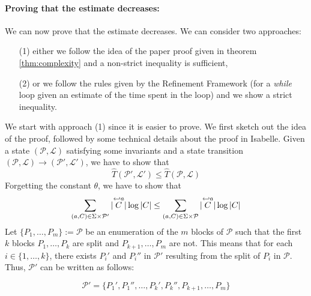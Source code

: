 \documentclass[12pt, a4 paper]{article}
\theoremstyle{definition}
\begin{document}
\paragraph{Proving that the estimate decreases:} We can now prove that the estimate decreases. We can consider two approaches:
\begin{itemize}
    \item[(1)] either we follow the idea of the paper proof given in theorem \ref{thm:complexity} and a non-strict inequality is sufficient,
    \item[(2)] or we follow the rules given by the Refinement Framework (for a \textit{while} loop given an estimate of the time spent in the loop) and we show a strict inequality.
\end{itemize}
We start with approach (1) since it is easier to prove. We first sketch out the idea of the proof, followed by some technical details about the proof in Isabelle. Given a state $(\mathcal{P}, \mathcal{L})$ satisfying some invariants and a state transition $(\mathcal{P}, \mathcal{L}) \rightarrow (\mathcal{P}', \mathcal{L}')$, we have to show that
\begin{equation*}
    \hat{T}(\mathcal{P}', \mathcal{L}') \leq \hat{T}(\mathcal{P}, \mathcal{L})
\end{equation*}
Forgetting the constant $\theta$, we have to show that
\begin{equation*}
    \sum_{(a, C) \in \Sigma\times \mathcal{P'}} | \overset{\hookleftarrow {a}}{C} | \log | C | \leq \sum_{(a, C) \in \Sigma\times \mathcal{P}} | \overset{\hookleftarrow {a}}{C} | \log | C |
\end{equation*}
Let $\{P_1, \dots, P_m\} := \mathcal{P}$ be an enumeration of the $m$ blocks of $\mathcal{P}$ such that the first $k$ blocks $P_1, \dots, P_k$ are split and $P_{k+1}, \dots, P_m$ are not.
This means that for each $i \in \{1, \dots, k\}$, there exists $P_i'$ and $P_i''$ in $\mathcal{P'}$ resulting from the split of $P_i$ in $\mathcal{P}$.
Thus, $\mathcal{P'}$ can be written as follows:

\begin{equation*}
    \mathcal{P'} = \{P_1', P_1'', \dots, P_k', P_k'', P_{k+1}, \dots, P_m\}
\end{equation*}
\end{document}

